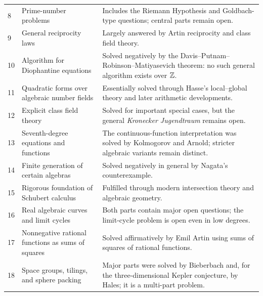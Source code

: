 {\begin{longtable}{@{}L{0.06\textwidth}L{0.31\textwidth}L{0.55\textwidth}@{}}
        8
        & Prime-number problems
        & Includes the Riemann Hypothesis and Goldbach-type questions; central
          parts remain open. \\

        9
        & General reciprocity laws
        & Largely answered by Artin reciprocity and class field theory. \\

        10
        & Algorithm for Diophantine equations
        & Solved negatively by the Davis--Putnam--Robinson--Matiyasevich
          theorem: no such general algorithm exists over $\mathbb{Z}$. \\

        11
        & Quadratic forms over algebraic number fields
        & Essentially solved through Hasse's local--global theory and later
          arithmetic developments. \\

        12
        & Explicit class field theory
        & Solved for important special cases, but the general
          \emph{Kronecker Jugendtraum} remains open. \\

        13
        & Seventh-degree equations and functions
        & The continuous-function interpretation was solved by Kolmogorov and
          Arnold; stricter algebraic variants remain distinct. \\

        14
        & Finite generation of certain algebras
        & Solved negatively in general by Nagata's counterexample. \\

        15
        & Rigorous foundation of Schubert calculus
        & Fulfilled through modern intersection theory and algebraic geometry. \\

        16
        & Real algebraic curves and limit cycles
        & Both parts contain major open questions; the limit-cycle problem is
          open even in low degrees. \\

        17
        & Nonnegative rational functions as sums of squares
        & Solved affirmatively by Emil Artin using sums of squares of rational
          functions. \\

        18
        & Space groups, tilings, and sphere packing
        & Major parts were solved by Bieberbach and, for the three-dimensional
          Kepler conjecture, by Hales; it is a multi-part problem. \\


\end{longtable}}
